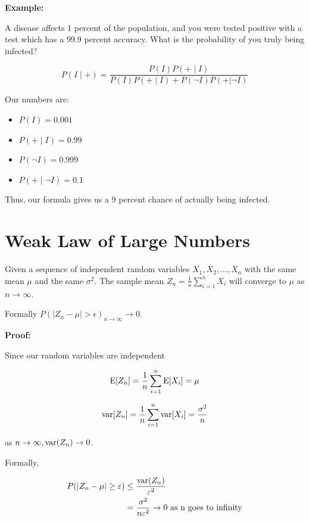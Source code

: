 \textbf{Example:}

A disease affects 1 percent of the population, and you were tested positive with a test which has a 99.9 percent accuracy. What is 
the probability of you truly being infected? 

\[
    P ( I \mid + ) = \frac{P(I)P(+ \mid I)}{P(I)P(+ \mid I) + P( \neg I) P( + | \neg I)}
\]

Our numbers are: 

\begin{itemize}
	
    \item \(P(I) = 0.001 \)

    \item \(P (+ \mid I) = 0.99\) 
    
    \item \(P(\neg I) =  0.999\)

    \item \(P (+ \mid \neg I) = 0.1\)  
    
\end{itemize}

Thus, our formula gives us a 9 percent chance of actually being infected.

\section{Weak Law of Large Numbers}

Given a sequence of independent random variables \(X_1, X_2, \dots, X_n\) with the same 
mean \(\mu\) and the same \(\sigma^2\). The sample mean \(Z_n = \frac{1}{n} \sum_{i = 1}^{n}X_i\) will 
converge to \(\mu\) as \(n \to \infty\).

Formally \(P(|Z_n - \mu| > \epsilon)_{n \to \infty} \to 0\).

\textbf{Proof:}

Since our random variables are independent 

\[
    \mathrm{E}[Z_n] = \frac{1}{n} \sum_{i = 1}^{n} \mathrm{E}[X_i] = \mu
\]

\[
    \mathrm{var}[Z_n] = \frac{1}{n} \sum_{i = 1}^{n} \mathrm{var}[X_i] = \frac{\sigma^2}{n}
\]

as \(n \to \infty, \mathrm{var}(Z_n) \to 0\).

Formally, 

\begin{align*}
    P(|Z_n - \mu | \ge \varepsilon) &\le \frac{\mathrm{var}(Z_n)}{\varepsilon^2} \\ 
    & = \frac{\sigma^2}{n \varepsilon^2} \to 0 \text{ as n goes to infinity}
\end{align*}

